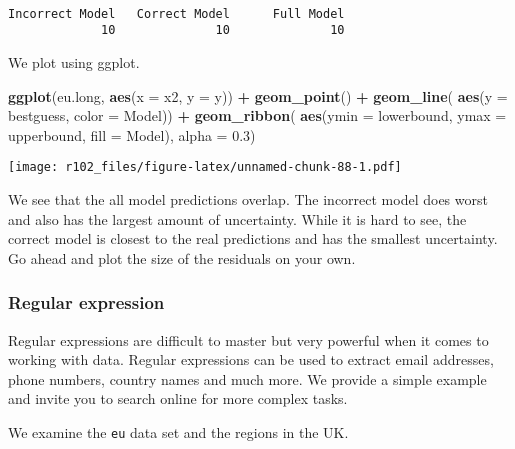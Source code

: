\documentclass[]{article}
\newenvironment{Shaded}{\begin{snugshade}}{\end{snugshade}}
\newcommand{\DataTypeTok}[1]{\textcolor[rgb]{0.13,0.29,0.53}{#1}}
\newcommand{\FloatTok}[1]{\textcolor[rgb]{0.00,0.00,0.81}{#1}}
\newcommand{\KeywordTok}[1]{\textcolor[rgb]{0.13,0.29,0.53}{\textbf{#1}}}
\newcommand{\NormalTok}[1]{#1}
\newcommand{\OperatorTok}[1]{\textcolor[rgb]{0.81,0.36,0.00}{\textbf{#1}}}
\newcommand{\StringTok}[1]{\textcolor[rgb]{0.31,0.60,0.02}{#1}}
\begin{document}
\begin{verbatim}

Incorrect Model   Correct Model      Full Model 
             10              10              10 
\end{verbatim}

We plot using ggplot.

\begin{Shaded}
\begin{Highlighting}[]
\KeywordTok{ggplot}\NormalTok{(eu.long, }\KeywordTok{aes}\NormalTok{(}\DataTypeTok{x =}\NormalTok{ x2, }\DataTypeTok{y =}\NormalTok{ y)) }\OperatorTok{+}
\StringTok{  }\KeywordTok{geom_point}\NormalTok{() }\OperatorTok{+}
\StringTok{  }\KeywordTok{geom_line}\NormalTok{( }\KeywordTok{aes}\NormalTok{(}\DataTypeTok{y =}\NormalTok{ bestguess, }\DataTypeTok{color =}\NormalTok{ Model)) }\OperatorTok{+}
\StringTok{  }\KeywordTok{geom_ribbon}\NormalTok{( }\KeywordTok{aes}\NormalTok{(}\DataTypeTok{ymin =}\NormalTok{ lowerbound, }\DataTypeTok{ymax =}\NormalTok{ upperbound, }\DataTypeTok{fill =}\NormalTok{ Model), }\DataTypeTok{alpha =} \FloatTok{0.3}\NormalTok{)}
\end{Highlighting}
\end{Shaded}

\texttt{[image: r102\_files/figure-latex/unnamed-chunk-88-1.pdf]}

We see that the all model predictions overlap. The incorrect model does worst and also has the largest amount of uncertainty. While it is hard to see, the correct model is closest to the real predictions and has the smallest uncertainty. Go ahead and plot the size of the residuals on your own.

\hypertarget{regular-expression}{%
\subsubsection{Regular expression}\label{regular-expression}}

Regular expressions are difficult to master but very powerful when it comes to working with data. Regular expressions can be used to extract email addresses, phone numbers, country names and much more. We provide a simple example and invite you to search online for more complex tasks.

We examine the \texttt{eu} data set and the regions in the UK.

\begin{Shaded}
\end{Shaded}
\end{document}
